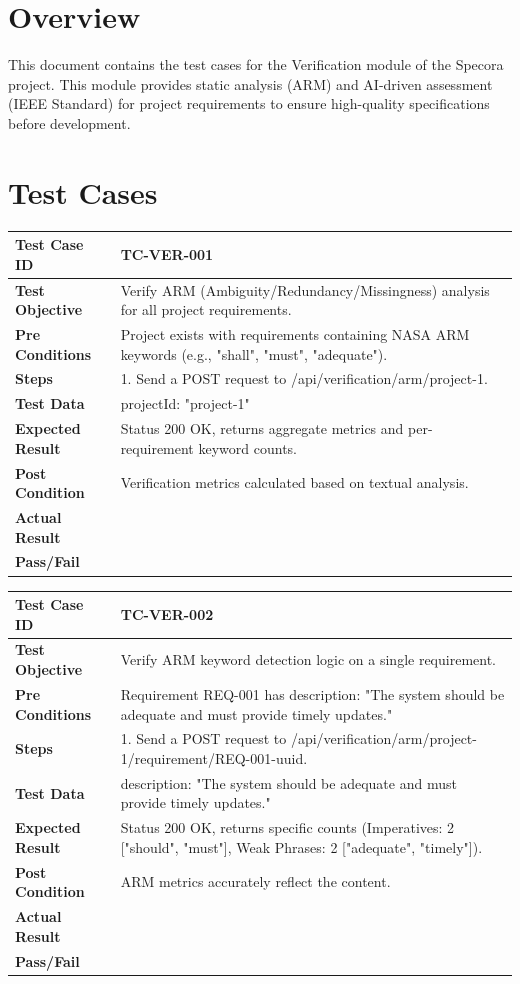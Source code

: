 \section{Overview}
This document contains the test cases for the Verification module of the Specora project. This module provides static analysis (ARM) and AI-driven assessment (IEEE Standard) for project requirements to ensure high-quality specifications before development.

\section{Test Cases}

\begin{longtable}{|p{}|p{}|}
\hline
\textbf{Test Case ID} & TC-VER-001 \\ \hline
\textbf{Test Objective} & Verify ARM (Ambiguity/Redundancy/Missingness) analysis for all project requirements. \\ \hline
\textbf{Pre Conditions} & Project exists with requirements containing NASA ARM keywords (e.g., "shall", "must", "adequate"). \\ \hline
\textbf{Steps} & 
1. Send a POST request to /api/verification/arm/project-1. \\ \hline
\textbf{Test Data} & projectId: "project-1" \\ \hline
\textbf{Expected Result} & Status 200 OK, returns aggregate metrics and per-requirement keyword counts. \\ \hline
\textbf{Post Condition} & Verification metrics calculated based on textual analysis. \\ \hline
\textbf{Actual Result} &  \\ \hline
\textbf{Pass/Fail} &  \\ \hline
\end{longtable}

\begin{longtable}{|p{}|p{}|}
\hline
\textbf{Test Case ID} & TC-VER-002 \\ \hline
\textbf{Test Objective} & Verify ARM keyword detection logic on a single requirement. \\ \hline
\textbf{Pre Conditions} & Requirement REQ-001 has description: "The system should be adequate and must provide timely updates." \\ \hline
\textbf{Steps} & 
1. Send a POST request to /api/verification/arm/project-1/requirement/REQ-001-uuid. \\ \hline
\textbf{Test Data} & description: "The system should be adequate and must provide timely updates." \\ \hline
\textbf{Expected Result} & Status 200 OK, returns specific counts (Imperatives: 2 ["should", "must"], Weak Phrases: 2 ["adequate", "timely"]). \\ \hline
\textbf{Post Condition} & ARM metrics accurately reflect the content. \\ \hline
\textbf{Actual Result} &  \\ \hline
\textbf{Pass/Fail} &  \\ \hline
\end{longtable}

